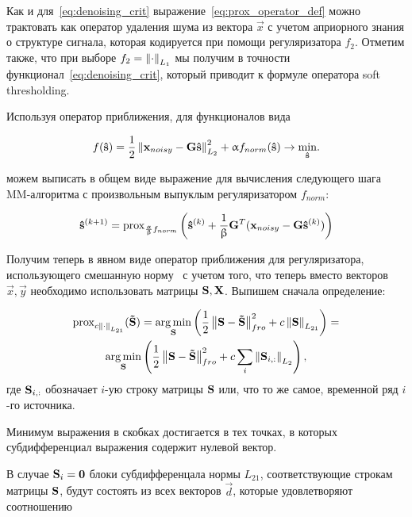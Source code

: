 Как и для~\ref{eq:denoising_crit} выражение~\ref{eq:prox_operator_def} можно
трактовать как оператор удаления шума из вектора $\vec{x}$ с учетом априорного
знания о структуре сигнала, которая кодируется при помощи регуляризатора $f_2$.
Отметим также, что при выборе $f_2 = \left\lVert\cdot\right\rVert_{L_1}$ мы получим в точности
функционал~\ref{eq:denoising_crit}, который приводит к формуле оператора
soft thresholding.

Используя оператор приближения, для функционалов вида

\begin{equation}
    f(\mathbf{\hat{s}}) = \frac{1}{2}\left\lVert\mathbf{x}_{noisy} - \mathbf{G}\mathbf{\hat{s}}\right\rVert^2_{L_2} + \upalpha f_{norm}(\mathbf{\hat{s}})
    \rightarrow \underset{\mathbf{\hat{s}}}{\min}.
    \label{eq:abstract_reg_func_crit}
\end{equation}

можем выписать в общем виде выражение для вычисления следующего шага
MM-алгоритма с произвольным выпуклым регуляризатором $f_{norm}$:

\begin{equation}
    \mathbf{\hat{s}}^{(k+1)} =
    \operatorname{prox}_{\frac{\upalpha}{\upbeta} f_{norm}}\left(\mathbf{\hat{s}}^{(k)} + \frac{1}{\upbeta} \mathbf{G}^T(\mathbf{x}_{noisy} - \mathbf{G} \mathbf{\hat{s}}^{(k)})\right)
    \label{eq:mm_next_iter_prox}
\end{equation}

Получим теперь в явном виде оператор приближения для регуляризатора,
использующего смешанную норму~\cite{Gramfort2012} с учетом того, что теперь
вместо векторов $\vec{x}, \vec{y}$ необходимо использовать матрицы $\mathbf{S},
\mathbf{X}$. Выпишем сначала определение:

\begin{multline}
    \operatorname{prox}_{c \left\lVert\cdot\right\rVert_{L_{21}}}(\mathbf{\tilde{S}}) =
    \operatorname*{arg\,min}_{\mathbf{S}}\left(\frac{1}{2}\left\lVert\mathbf{S - \tilde{S}}\right\rVert^2_{fro} + c \left\lVert\mathbf{S}\right\rVert_{L_{21}}\right)=\\
    \operatorname*{arg\,min}_{\mathbf{S}}\left(\frac{1}{2}\left\lVert\mathbf{S - \tilde{S}}\right\rVert^2_{fro} + c \sum_i \left\lVert\mathbf{S}_{i,:}\right\rVert_{L_2}\right),
    \label{eq:def_proximity_for_l21}
\end{multline}
где $\mathbf{S}_{i,:}$ обозначает $i$-ую строку матрицы $\mathbf{S}$ или, что то же
самое, временной ряд $i$-го источника.

Минимум выражения в скобках достигается в тех точках, в которых субдифференциал
выражения содержит нулевой вектор.

В случае $\mathbf{S}_i = \mathbf{0}$ блоки субдифференцала нормы $L_{21}$,
соответствующие строкам матрицы $\mathbf{S}$,
будут состоять из всех
векторов $\vec{d}$, которые удовлетворяют соотношению

